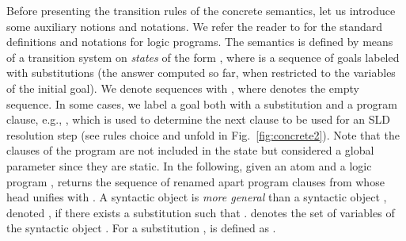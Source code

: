 \documentclass[fleqn]{tlp}
\begin{document}
Before presenting the transition rules of the concrete semantics, let
us introduce some auxiliary notions and notations. We refer
  the reader to \cite{Apt97} for the standard definitions and
  notations for logic programs.
The semantics is defined by means of a transition system on
\emph{states} of the form
, where
 is a sequence of
goals labeled with substitutions (the answer computed so far, when
restricted to the variables of the initial goal).  We denote sequences
with , where  denotes the empty sequence.  In
some cases, we label a goal  both with a substitution and a
program clause, e.g., , which is used to
determine the next clause to be used for an SLD resolution step (see
rules \textsf{choice} and \textsf{unfold} in Fig.~\ref{fig:concrete2}).
Note that the clauses of the program are not included in the state but
considered a global parameter since they are static.
In the following, given an atom 
and a logic program , 
returns the sequence of renamed apart program clauses  
from  whose head unifies with .
A syntactic object  is \emph{more general} than a syntactic object
, denoted , if there exists a substitution
 such that .
 denotes the set of variables of the syntactic object . 
For a substitution ,  is defined as .
\end{document}

